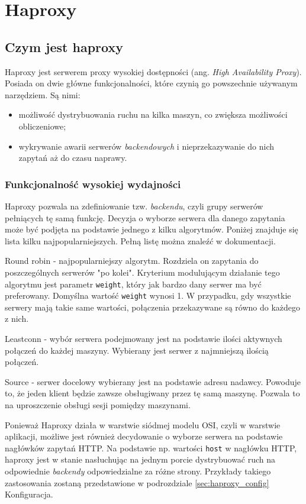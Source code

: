 {\section{Haproxy}
\subsection{Czym jest haproxy}
Haproxy jest serwerem proxy wysokiej dostępności (ang. \textit{High Availability Proxy}).
Posiada on dwie główne funkcjonalności, które czynią go powszechnie używanym narzędziem.
Są nimi:\\
\begin{itemize}
	\item możliwość dystrybuowania ruchu na kilka maszyn, co zwiększa możliwości obliczeniowe;
	\item wykrywanie awarii serwerów \textit{backendowych} i nieprzekazywanie do nich zapytań aż do czasu naprawy.
\end{itemize}
\subsubsection{Funkcjonalność wysokiej wydajności}
Haproxy pozwala na zdefiniowanie tzw. \textit{backendu}, czyli grupy serwerów pełniących tę samą funkcję.
Decyzja o wyborze serwera dla danego zapytania może być podjęta na podstawie jednego z kilku algorytmów.
Poniżej znajduje się lista kilku najpopularniejszych. Pełną listę można znaleźć w dokumentacji.\\

\begin{description}
	\item{Round robin} - 
		najpopularniejszy algorytm. Rozdziela on zapytania do poszczególnych serwerów "po kolei".
		Kryterium modulującym działanie tego algorytmu jest parametr \texttt{weight}, który jak bardzo dany serwer ma być preferowany.
		Domyślna wartość \texttt{weight} wynosi 1. W przypadku, gdy wszystkie serwery mają takie same wartości, połączenia przekazywane są równo do każdego z nich.
	\item{Leastconn} - 
		wybór serwera podejmowany jest na podstawie ilości aktywnych połączeń do każdej maszyny.
		Wybierany jest serwer z najmniejszą ilością połączeń.
	\item{Source} - 
		serwer docelowy wybierany jest na podstawie adresu nadawcy.
		Powoduje to, że jeden klient będzie zawsze obsługiwany przez tę samą maszynę. Pozwala to na uproszczenie obsługi sesji pomiędzy maszynami.
\end{description}
Ponieważ Haproxy działa w warstwie siódmej modelu OSI, czyli w warstwie aplikacji, możliwe jest również decydowanie o wyborze serwera na podstawie nagłówków zapytań HTTP.
Na podstawie np. wartości \texttt{host} w nagłówku HTTP, haproxy jest w stanie nasłuchując na jednym porcie dystrybuować ruch na odpowiednie \textit{backendy} odpowiedzialne za różne strony.
Przykłady takiego zastosowania zostaną przedstawione w podrozdziale \ref{sec:haproxy_config} Konfiguracja.
}
